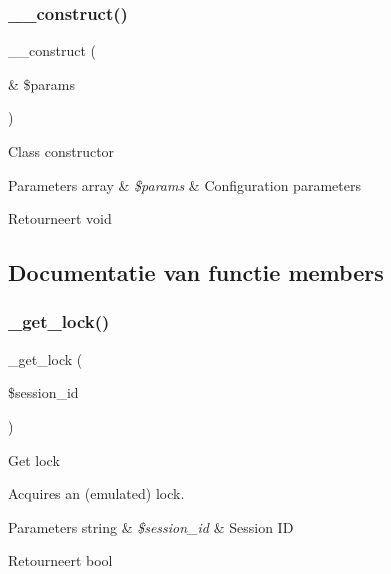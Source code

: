 \subsubsection{\texorpdfstring{\_\_construct()}{\_\_construct()}}
{\footnotesize\ttfamily \+\_\+\+\_\+construct (\begin{DoxyParamCaption}\item[{\&}]{\$params }\end{DoxyParamCaption})}

Class constructor


\begin{DoxyParams}[1]{Parameters}
array & {\em \$params} & Configuration parameters \\
\hline
\end{DoxyParams}
\begin{DoxyReturn}{Retourneert}
void 
\end{DoxyReturn}


\subsection{Documentatie van functie members}
\mbox{\label{class_c_i___session__memcached__driver_a2c49c8e23be3e2aca96a9d20de18ffc2}} 
\subsubsection{\texorpdfstring{\_get\_lock()}{\_get\_lock()}}
{\footnotesize\ttfamily \+\_\+get\+\_\+lock (\begin{DoxyParamCaption}\item[{}]{\$session\+\_\+id }\end{DoxyParamCaption})\hspace{0.3cm}{\ttfamily [protected]}}

Get lock

Acquires an (emulated) lock.


\begin{DoxyParams}[1]{Parameters}
string & {\em \$session\+\_\+id} & Session ID \\
\hline
\end{DoxyParams}
\begin{DoxyReturn}{Retourneert}
bool 
\end{DoxyReturn}
\mbox{\label{class_c_i___session__memcached__driver_a0265e356e6cf1eaba229663c1664c37d}} 
